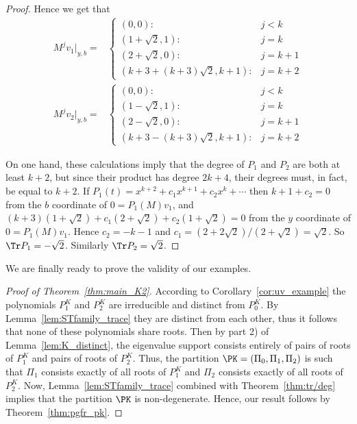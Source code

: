 \begin{proof}
Hence we get that 
\begin{align*}
M^j v_1|_{y,b} =& \left\{ \begin{array}{cl} (0,0):& j < k \\ (1 + \sqrt{2}, 1) :& j = k\\  (2+\sqrt{2},0)  :& j = k+1 \\ ( k+3 +(k+3)\sqrt{2}, k+1)  :& j = k+2 \end{array} \right. \\
M^j v_2|_{y,b} =& \left\{ \begin{array}{cl} (0,0):& j < k \\ (1 - \sqrt{2}, 1) :& j = k\\  (2-\sqrt{2},0)  :& j = k+1 \\ ( k+3 -(k+3)\sqrt{2}, k+1)  :& j = k+2 \end{array} \right. 
\end{align*}

On one hand, these calculations imply that the degree of $P_1$ and $P_2$ are both at least $k+2$, but since their product has degree $2k+4$, their degrees must, in fact, be equal to $k+2$. If $P_1(t) = x^{k+2} + c_1 x^{k+1} + c_2 x^k + \cdots$ then $k+1 + c_2 = 0$ from the $b$ coordinate of $0 = P_1(M)v_1$, and $(k+3)(1+\sqrt{2}) + c_1(2+\sqrt{2}) + c_2(1+\sqrt{2}) =0$ from the $y$ coordinate of $0 = P_1(M)v_1$. Hence $c_2 = -k-1$ and $c_1 = (2+2\sqrt{2})/(2+\sqrt{2}) = 
\sqrt{2}$. So $\Tr P_1 = -\sqrt{2}$. Similarly $\Tr P_2 = \sqrt{2}$. 
\end{proof}

We are finally ready to prove the validity of our examples.

\begin{proof}[Proof of Theorem~\ref{thm:main_K2}]
According to Corollary~\ref{cor:uv_example} the polynomials $P^K_1$ and $P^K_2$ are irreducible and distinct from $P^K_0$. By Lemma~\ref{lem:STfamily_trace} they are distinct from each other, thus it follows that none of these polynomials share roots. Then by part 2) of Lemma~\ref{lem:K_distinct}, the eigenvalue support consists entirely of pairs of roots of $P^K_1$ and pairs of roots of $P^K_2$. Thus, the partition $\PK = (\Pi_0, \Pi_1, \Pi_2)$ is such that $\Pi_1$ consists exactly of all roots of $P^K_1$ and $\Pi_2$ consists exactly of all roots of $P^K_2$. Now, Lemma~\ref{lem:STfamily_trace} combined with Theorem~\ref{thm:tr/deg} implies that the partition $\PK$ is non-degenerate. Hence, our result follows by Theorem~\ref{thm:pgfr_pk}.
\end{proof}



